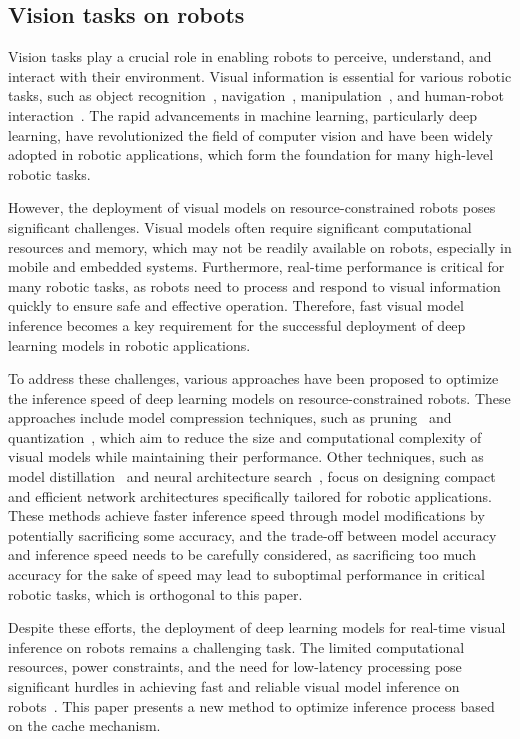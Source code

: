 \subsection{Vision tasks on robots}
Vision tasks play a crucial role in enabling robots to perceive, understand, and interact with their environment. 
Visual information is essential for various robotic tasks, such as object recognition~\cite{galvez2018object}, navigation~\cite{ran2017convolutional}, manipulation~\cite{bayar2018constrained}, and human-robot interaction~\cite{wu2019weight}. 
The rapid advancements in machine learning, particularly deep learning, have revolutionized the field of computer vision and have been widely adopted in robotic applications, which form the foundation for many high-level robotic tasks.

However, the deployment of visual models on resource-constrained robots poses significant challenges. 
Visual models often require significant computational resources and memory, which may not be readily available on robots, especially in mobile and embedded systems. 
Furthermore, real-time performance is critical for many robotic tasks, as robots need to process and respond to visual information quickly to ensure safe and effective operation. 
Therefore, fast visual model inference becomes a key requirement for the successful deployment of deep learning models in robotic applications.

To address these challenges, various approaches have been proposed to optimize the inference speed of deep learning models on resource-constrained robots. 
These approaches include model compression techniques, such as pruning~\cite{liu2018rethinking} and quantization~\cite{polino2018model}, which aim to reduce the size and computational complexity of visual models while maintaining their performance. 
Other techniques, such as model distillation~\cite{gou2021knowledge} and neural architecture search~\cite{tan2019mnasnet}, focus on designing compact and efficient network architectures specifically tailored for robotic applications. 
These methods achieve faster inference speed through model modifications by potentially sacrificing some accuracy, and the trade-off between model accuracy and inference speed needs to be carefully considered, as sacrificing too much accuracy for the sake of speed may lead to suboptimal performance in critical robotic tasks, which is orthogonal to this paper.

Despite these efforts, the deployment of deep learning models for real-time visual inference on robots remains a challenging task.
The limited computational resources, power constraints, and the need for low-latency processing pose significant hurdles in achieving fast and reliable visual model inference on robots~\cite{sun2024hybridparallel}. 
This paper presents a new method to optimize inference process based on the cache mechanism.

